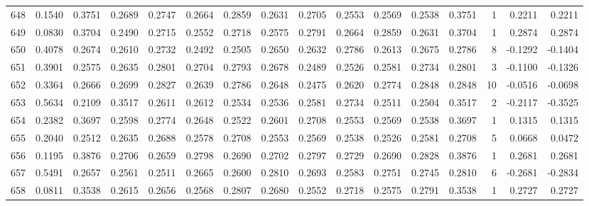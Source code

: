 \begin{tabular}{lrrrrrrrrrrrrrrr}
648 &      0.1540 &  0.3751 &  0.2689 &  0.2747 &  0.2664 &  0.2859 &  0.2631 &  0.2705 &  0.2553 &  0.2569 &   0.2538 &     0.3751 &      1 &                    0.2211 &                     0.2211 \\
649 &      0.0830 &  0.3704 &  0.2490 &  0.2715 &  0.2552 &  0.2718 &  0.2575 &  0.2791 &  0.2664 &  0.2859 &   0.2631 &     0.3704 &      1 &                    0.2874 &                     0.2874 \\
650 &      0.4078 &  0.2674 &  0.2610 &  0.2732 &  0.2492 &  0.2505 &  0.2650 &  0.2632 &  0.2786 &  0.2613 &   0.2675 &     0.2786 &      8 &                   -0.1292 &                    -0.1404 \\
651 &      0.3901 &  0.2575 &  0.2635 &  0.2801 &  0.2704 &  0.2793 &  0.2678 &  0.2489 &  0.2526 &  0.2581 &   0.2734 &     0.2801 &      3 &                   -0.1100 &                    -0.1326 \\
652 &      0.3364 &  0.2666 &  0.2699 &  0.2827 &  0.2639 &  0.2786 &  0.2648 &  0.2475 &  0.2620 &  0.2774 &   0.2848 &     0.2848 &     10 &                   -0.0516 &                    -0.0698 \\
653 &      0.5634 &  0.2109 &  0.3517 &  0.2611 &  0.2612 &  0.2534 &  0.2536 &  0.2581 &  0.2734 &  0.2511 &   0.2504 &     0.3517 &      2 &                   -0.2117 &                    -0.3525 \\
654 &      0.2382 &  0.3697 &  0.2598 &  0.2774 &  0.2648 &  0.2522 &  0.2601 &  0.2708 &  0.2553 &  0.2569 &   0.2538 &     0.3697 &      1 &                    0.1315 &                     0.1315 \\
655 &      0.2040 &  0.2512 &  0.2635 &  0.2688 &  0.2578 &  0.2708 &  0.2553 &  0.2569 &  0.2538 &  0.2526 &   0.2581 &     0.2708 &      5 &                    0.0668 &                     0.0472 \\
656 &      0.1195 &  0.3876 &  0.2706 &  0.2659 &  0.2798 &  0.2690 &  0.2702 &  0.2797 &  0.2729 &  0.2690 &   0.2828 &     0.3876 &      1 &                    0.2681 &                     0.2681 \\
657 &      0.5491 &  0.2657 &  0.2561 &  0.2511 &  0.2665 &  0.2600 &  0.2810 &  0.2693 &  0.2583 &  0.2751 &   0.2745 &     0.2810 &      6 &                   -0.2681 &                    -0.2834 \\
658 &      0.0811 &  0.3538 &  0.2615 &  0.2656 &  0.2568 &  0.2807 &  0.2680 &  0.2552 &  0.2718 &  0.2575 &   0.2791 &     0.3538 &      1 &                    0.2727 &                     0.2727 \\

\end{tabular}
